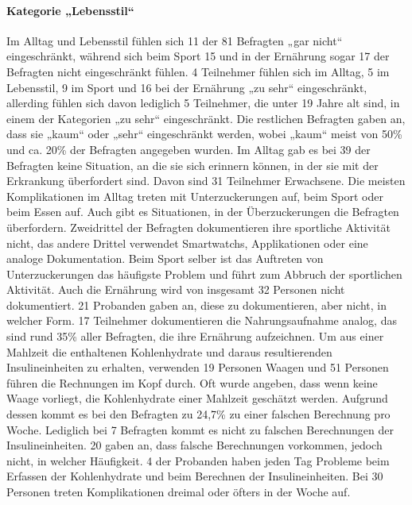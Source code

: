 \documentclass[a4paper,11pt]{article}%
\renewcommand{\\}{\vspace*{0.5\baselineskip} \newline}
\begin{document}
\paragraph{Kategorie „Lebensstil“}\mbox{}\\
	Im Alltag und Lebensstil fühlen sich 11 der 81 Befragten „gar nicht“ eingeschränkt, während sich beim Sport 15 und in der Ernährung sogar 17 der Befragten nicht eingeschränkt fühlen. 4 Teilnehmer fühlen sich im Alltag, 5 im Lebensstil, 9 im Sport und 16 bei der Ernährung „zu sehr“ eingeschränkt, allerding fühlen sich davon lediglich 5 Teilnehmer, die unter 19 Jahre alt sind, in einem der Kategorien „zu sehr“ eingeschränkt. Die restlichen Befragten gaben an, dass sie „kaum“ oder „sehr“ eingeschränkt werden, wobei „kaum“ meist von 50\% und ca. 20\% der Befragten angegeben wurden.\newline
	Im Alltag gab es bei 39 der Befragten keine Situation, an die sie sich erinnern können, in der sie mit der Erkrankung überfordert sind. Davon sind 31 Teilnehmer Erwachsene. Die meisten Komplikationen im Alltag treten mit Unterzuckerungen auf, beim Sport oder beim Essen auf. Auch gibt es Situationen, in der Überzuckerungen die Befragten überfordern.\newline
	Zweidrittel der Befragten dokumentieren ihre sportliche Aktivität nicht, das andere Drittel verwendet Smartwatchs, Applikationen oder eine analoge Dokumentation. Beim Sport selber ist das Auftreten von Unterzuckerungen das häufigste Problem und führt zum Abbruch der sportlichen Aktivität.\newline
	Auch die Ernährung wird von insgesamt 32 Personen nicht dokumentiert. 21 Probanden gaben an, diese zu dokumentieren, aber nicht, in welcher Form. 17 Teilnehmer dokumentieren die Nahrungsaufnahme analog, das sind rund 35\% aller Befragten, die ihre Ernährung aufzeichnen.\newline
	Um aus einer Mahlzeit die enthaltenen Kohlenhydrate und daraus resultierenden Insulineinheiten zu erhalten, verwenden 19 Personen Waagen und 51 Personen führen die Rechnungen im Kopf durch. Oft wurde angeben, dass wenn keine Waage vorliegt, die Kohlenhydrate einer Mahlzeit geschätzt werden. Aufgrund dessen kommt es bei den Befragten zu 24,7\% zu einer falschen Berechnung pro Woche. Lediglich bei 7 Befragten kommt es nicht zu falschen Berechnungen der Insulineinheiten. 20 gaben an, dass falsche Berechnungen vorkommen, jedoch nicht, in welcher Häufigkeit. 4 der Probanden haben jeden Tag Probleme beim Erfassen der Kohlenhydrate und beim Berechnen der Insulineinheiten. Bei 30 Personen treten Komplikationen dreimal oder öfters in der Woche auf.
\end{document}
